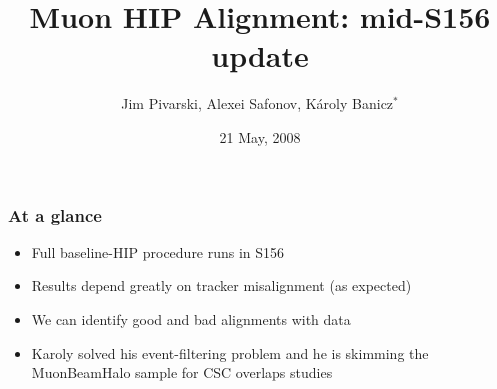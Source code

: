 \documentclass[compress]{beamer}
\title{Muon HIP Alignment: mid-S156 update}
\author{Jim Pivarski, Alexei Safonov, K\'aroly Banicz$^*$}
\institute{Texas A\&M University, $^*$FermiLab}
\date{21 May, 2008}
\begin{document}
\frame{\titlepage}


\begin{frame}
\frametitle{At a glance}
\begin{itemize}\setlength{\itemsep}{0.75 cm}
\item Full baseline-HIP procedure runs in S156
\item Results depend greatly on tracker misalignment (as expected)
\item We can identify good and bad alignments with data
\item Karoly solved his event-filtering problem and he is skimming
the MuonBeamHalo sample for CSC overlaps studies
\end{itemize}
\end{frame}
\end{document}
